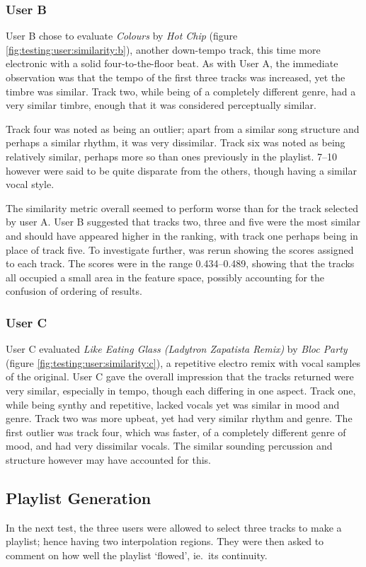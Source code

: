 \subsubsection{User B}
User B chose to evaluate \emph{Colours} by \emph{Hot Chip} (figure \ref{fig:testing:user:similarity:b}), another down-tempo track, this time more electronic with a solid four-to-the-floor beat. As with User A, the immediate observation was that the tempo of the first three tracks was increased, yet the timbre was similar. Track two, while being of a completely different genre, had a very similar timbre, enough that it was considered perceptually similar.


Track four was noted as being an outlier; apart from a similar song structure and perhaps a similar rhythm, it was very dissimilar. Track six was noted as being relatively similar, perhaps more so than ones previously in the playlist. 7--10 however were said to be quite disparate from the others, though having a similar vocal style.

The similarity metric overall seemed to perform worse than for the track selected by user A. User B suggested that tracks two, three and five were the most similar and should have appeared higher in the ranking, with track one perhaps being in place of track five. To investigate further,  was rerun showing the scores assigned to each track. The scores were in the range 0.434--0.489, showing that the tracks all occupied a small area in the feature space, possibly accounting for the confusion of ordering of results.
\subsubsection{User C}
User C evaluated \emph{Like Eating Glass (Ladytron Zapatista Remix)} by \emph{Bloc Party} (figure \ref{fig:testing:user:similarity:c}), a repetitive electro remix with vocal samples of the original. User C gave the overall impression that the tracks returned were very similar, especially in tempo, though each differing in one aspect. Track one, while being synthy and repetitive, lacked vocals yet was similar in mood and genre. Track two was more upbeat, yet had very similar rhythm and genre. The first outlier was track four, which was faster, of a completely different genre of mood, and had very dissimilar vocals. The similar sounding percussion and structure however may have accounted for this.

\subsection{Playlist Generation}
In the next test, the three users were allowed to select three tracks to make a playlist; hence having two interpolation regions. They were then asked to comment on how well the playlist `flowed', ie.\ its continuity.
